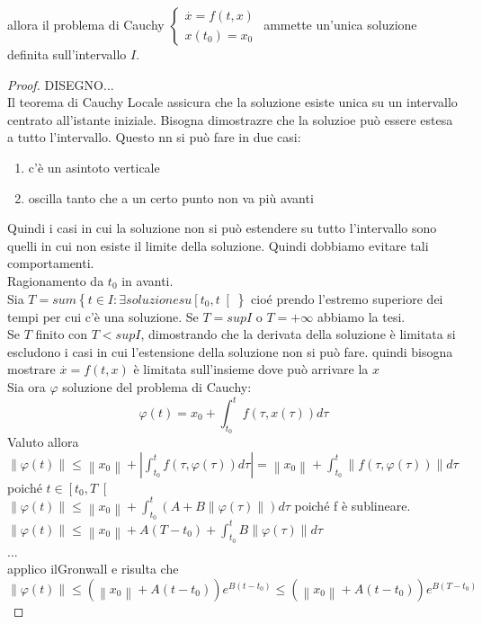 allora il problema di Cauchy $\left\{\begin{matrix}\overset{\cdot}{x}=f(t,x)\\x(t_0)=x_0\end{matrix}\right.$ ammette un'unica soluzione definita sull'intervallo $I$.
\begin{proof}
	DISEGNO...\\
	Il teorema di Cauchy Locale assicura che  la soluzione esiste unica su un intervallo centrato all'istante iniziale.
	Bisogna dimostrazre che la soluzioe può essere estesa a tutto l'intervallo. Questo nn si può fare in due casi:
	\begin{enumerate}
		\item c'è un asintoto verticale
		\item oscilla tanto che a un certo punto non va più avanti
	\end{enumerate}
	Quindi i casi in cui la soluzione non si può estendere su tutto l'intervallo sono quelli in cui non esiste il limite della soluzione. Quindi dobbiamo evitare tali comportamenti.\\
	Ragionamento da $t_0$ in avanti.\\
	Sia $T=sum\left\{t\in I :\exists soluzione su \left[ t_0,t \right[ \right\}$ cio\'e prendo l'estremo superiore dei tempi per cui c'è una soluzione.
	Se $T= sup I$ o $T=+\infty$ abbiamo la tesi.\\
	Se $T$ finito con $T<sup I$, dimostrando che la derivata della soluzione è limitata si escludono i casi in cui l'estensione della soluzione non si può fare.
	quindi bisogna mostrare $\overset{\cdot}{x} = f(t,x)$ è limitata sull'insieme dove può arrivare la $x$\\
	Sia ora $\varphi$ soluzione del problema di Cauchy:
	$$ \varphi(t) = x_0 + \int_{t_0}^tf(\tau,x(\tau))d\tau$$
	Valuto allora\\
	$\left\|\varphi(t)\right\|\le \left\|x_0\right\| + \left|\int_{t_0}^tf(\tau,\varphi(\tau))d\tau\right|=\left\|x_0\right\| + \int_{t_0}^t\left\|f(\tau,\varphi(\tau))\right\|d\tau$ poiché $t\in\left[t_0,T\right[$\\
	$\left\|\varphi(t)\right\|\le \left\|x_0\right\| + \int_{t_0}^t\left(A+B\left\|\varphi(\tau)\right\|\right)d\tau$ poiché f è sublineare.\\
	$\left\|\varphi(t)\right\|\le \left\|x_0\right\| + A(T-t_0)+\int_{t_0}^t B\left\|\varphi(\tau)\right\|d\tau$\\
	...\\
	applico ilGronwall e risulta che
	$$\left\|\varphi(t)\right\|\le\left(\left\|x_0\right\|+A(t-t_0)\right)e^{B(t-t_0)}\le\left(\left\|x_0\right\|+A(t-t_0)\right)e^{B(T-t_0)}$$	

\end{proof}
